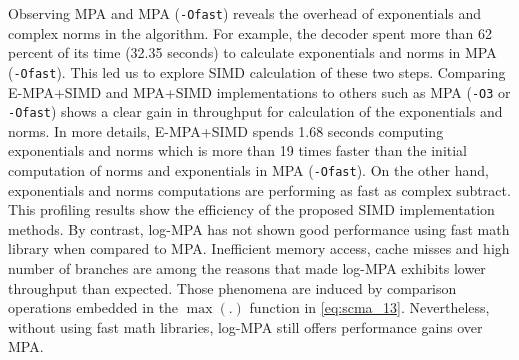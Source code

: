 Observing MPA and MPA (\verb|-Ofast|) reveals the overhead of exponentials and
complex norms in the algorithm. For example, the decoder spent more than 62
percent of its time (32.35 seconds) to calculate exponentials and norms in MPA
(\verb|-Ofast|). This led us to explore SIMD calculation of these two steps.
Comparing E-MPA+SIMD and MPA+SIMD implementations to others such as MPA
(\verb|-O3| or \verb|-Ofast|) shows a clear gain in throughput for calculation
of the exponentials and norms. In more details, E-MPA+SIMD spends 1.68 seconds
computing exponentials and norms which is more than 19 times faster than the
initial computation of norms and exponentials in MPA (\verb|-Ofast|). On the
other hand, exponentials and norms computations are performing as fast as
complex subtract. This profiling results show the efficiency of the proposed
SIMD implementation methods. By contrast, log-MPA has not shown good performance
using fast math library when compared to MPA. Inefficient memory access, cache
misses and high number of branches are among the reasons that made log-MPA
exhibits lower throughput than expected. Those phenomena are induced by
comparison operations embedded in the $\max(.)$ function in \eqref{eq:scma_13}.
Nevertheless, without using fast math libraries, log-MPA
still offers performance gains over MPA.